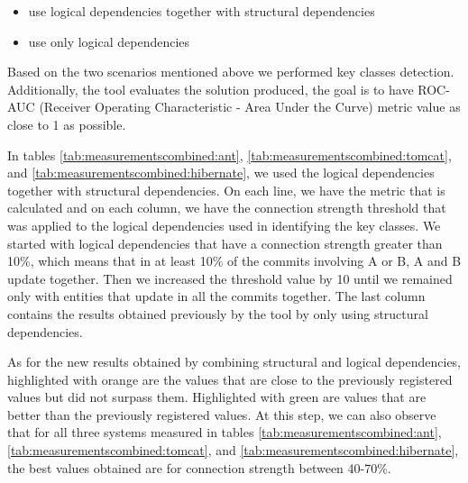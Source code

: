 \documentclass[12pt]{mitthesis}
\begin{document}
\begin{itemize}
	\item use logical dependencies together with structural dependencies 
	\item use only logical dependencies
\end{itemize}

Based on the two scenarios mentioned above we performed key classes detection. Additionally, the tool evaluates the solution produced, the goal is to have ROC-AUC (Receiver Operating Characteristic - Area Under the Curve) metric value as close to 1 as possible.

In tables \ref{tab:measurementscombined:ant}, \ref{tab:measurementscombined:tomcat}, and \ref{tab:measurementscombined:hibernate}, we used the logical dependencies together with structural dependencies. On each line, we have the metric that is calculated and on each column, we have the connection strength threshold that was applied to the logical dependencies used in identifying the key classes.
We started with logical dependencies that have a connection strength greater than 10\%, which means that in at least 10\% of the commits involving A or B, A and B update together. Then we increased the threshold value by 10 until we remained only with entities that update in all the commits together. The last column contains the results obtained previously by the tool by only using structural dependencies.

As for the new results obtained by combining structural and logical dependencies, highlighted with orange are the values that are close to the previously registered values but did not surpass them. Highlighted with green are values that are better than the previously registered values. At this step, we can also observe that for all three systems measured in tables \ref{tab:measurementscombined:ant}, \ref{tab:measurementscombined:tomcat}, and \ref{tab:measurementscombined:hibernate}, the best values obtained are for connection strength between 40-70\%.
\end{document}
